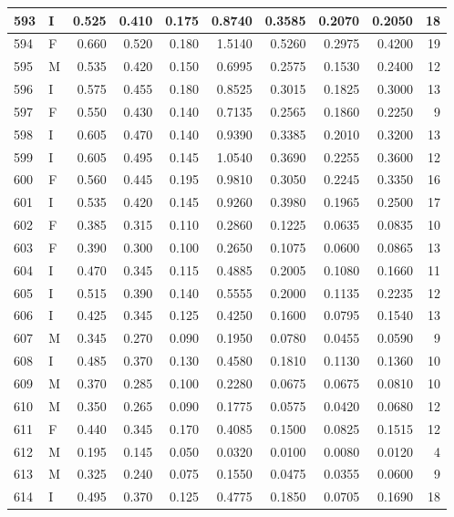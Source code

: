 \documentclass[9pt,twocolumn,twoside,]{pnas-new}
\begin{document}
\begin{tabular}{l|l|r|r|r|r|r|r|r|r}
\hline
593 & I & 0.525 & 0.410 & 0.175 & 0.8740 & 0.3585 & 0.2070 & 0.2050 & 18\\
\hline
594 & F & 0.660 & 0.520 & 0.180 & 1.5140 & 0.5260 & 0.2975 & 0.4200 & 19\\
\hline
595 & M & 0.535 & 0.420 & 0.150 & 0.6995 & 0.2575 & 0.1530 & 0.2400 & 12\\
\hline
596 & I & 0.575 & 0.455 & 0.180 & 0.8525 & 0.3015 & 0.1825 & 0.3000 & 13\\
\hline
597 & F & 0.550 & 0.430 & 0.140 & 0.7135 & 0.2565 & 0.1860 & 0.2250 & 9\\
\hline
598 & I & 0.605 & 0.470 & 0.140 & 0.9390 & 0.3385 & 0.2010 & 0.3200 & 13\\
\hline
599 & I & 0.605 & 0.495 & 0.145 & 1.0540 & 0.3690 & 0.2255 & 0.3600 & 12\\
\hline
600 & F & 0.560 & 0.445 & 0.195 & 0.9810 & 0.3050 & 0.2245 & 0.3350 & 16\\
\hline
601 & I & 0.535 & 0.420 & 0.145 & 0.9260 & 0.3980 & 0.1965 & 0.2500 & 17\\
\hline
602 & F & 0.385 & 0.315 & 0.110 & 0.2860 & 0.1225 & 0.0635 & 0.0835 & 10\\
\hline
603 & F & 0.390 & 0.300 & 0.100 & 0.2650 & 0.1075 & 0.0600 & 0.0865 & 13\\
\hline
604 & I & 0.470 & 0.345 & 0.115 & 0.4885 & 0.2005 & 0.1080 & 0.1660 & 11\\
\hline
605 & I & 0.515 & 0.390 & 0.140 & 0.5555 & 0.2000 & 0.1135 & 0.2235 & 12\\
\hline
606 & I & 0.425 & 0.345 & 0.125 & 0.4250 & 0.1600 & 0.0795 & 0.1540 & 13\\
\hline
607 & M & 0.345 & 0.270 & 0.090 & 0.1950 & 0.0780 & 0.0455 & 0.0590 & 9\\
\hline
608 & I & 0.485 & 0.370 & 0.130 & 0.4580 & 0.1810 & 0.1130 & 0.1360 & 10\\
\hline
609 & M & 0.370 & 0.285 & 0.100 & 0.2280 & 0.0675 & 0.0675 & 0.0810 & 10\\
\hline
610 & M & 0.350 & 0.265 & 0.090 & 0.1775 & 0.0575 & 0.0420 & 0.0680 & 12\\
\hline
611 & F & 0.440 & 0.345 & 0.170 & 0.4085 & 0.1500 & 0.0825 & 0.1515 & 12\\
\hline
612 & M & 0.195 & 0.145 & 0.050 & 0.0320 & 0.0100 & 0.0080 & 0.0120 & 4\\
\hline
613 & M & 0.325 & 0.240 & 0.075 & 0.1550 & 0.0475 & 0.0355 & 0.0600 & 9\\
\hline
614 & I & 0.495 & 0.370 & 0.125 & 0.4775 & 0.1850 & 0.0705 & 0.1690 & 18\\

\end{tabular}
\end{document}
